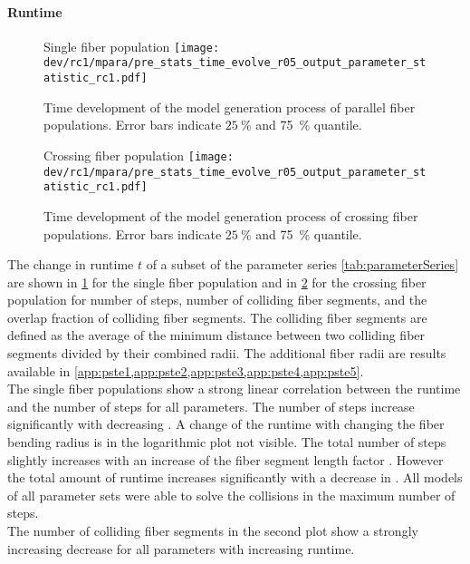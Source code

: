 \paragraph{Runtime}
% 
\begin{figure}[p]
\centering
Single fiber population \vspace{1em}
\texttt{[image: dev/rc1/mpara/pre\_stats\_time\_evolve\_r05\_output\_parameter\_statistic\_rc1.pdf]}
\caption[Time development parallel]{Time development of the model generation process of parallel fiber populations. Error bars indicate $\SI{25}{\percent}$ and \SI{75}{\percent} quantile.}
\label{fig:timeDevelopmentNone}
\end{figure}
% 
\begin{figure}[p]
\centering
Crossing fiber population \vspace{1em}
\texttt{[image: dev/rc1/mpara/pre\_stats\_time\_evolve\_r05\_output\_parameter\_statistic\_rc1.pdf]}
\caption[Time development parallel]{Time development of the model generation process of crossing fiber populations. Error bars indicate $\SI{25}{\percent}$ and \SI{75}{\percent} quantile.}
\label{fig:timeDevelopmentCross}
\end{figure}
% 
The change in runtime $t$ of a subset of the parameter series \cref{tab:parameterSeries} are shown in \cref{fig:timeDevelopmentNone} for the single fiber population and in \cref{fig:timeDevelopmentCross} for the crossing fiber population for number of steps, number of colliding fiber segments, and the overlap fraction of colliding fiber segments.
The colliding fiber segments are defined as the average of the minimum distance between two colliding fiber segments divided by their combined radii.
The additional fiber radii are results available in \cref{app:pste1,app:pste2,app:pste3,app:pste4,app:pste5}.
\\
% 
The single fiber populations show a strong linear correlation between the runtime and the number of steps for all parameters.
The number of steps increase significantly with decreasing \segLengthFactor{}.
A change of the runtime with changing the fiber bending radius \segRadiusFactor{} is in the logarithmic plot not visible.
The total number of steps slightly  increases with an increase of the fiber segment length factor \segLengthFactor{}.
However the total amount of runtime increases significantly with a decrease in \segLengthFactor{}.
All models of all parameter sets were able to solve the collisions in the maximum number of steps.
\\
% 
The number of colliding fiber segments in the second plot show a strongly increasing decrease for all parameters with increasing runtime.
